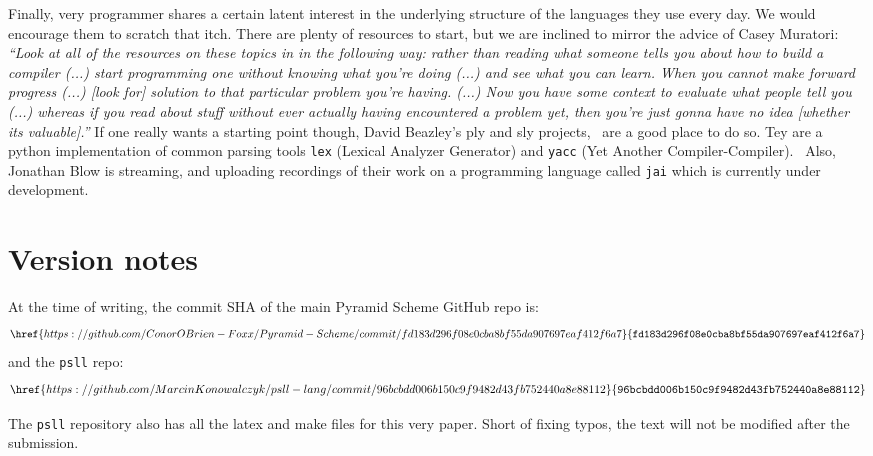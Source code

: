 \documentclass[aip,jcp,reprint,footinbib]{revtex4-1}
\let\tt\texttt
\newcommand\psll{\texttt{psll}\xspace}
\begin{document}
Finally, very programmer shares a certain latent interest in the underlying structure of the languages they use every day. We would encourage them to scratch that itch. There are plenty of resources to start, but we are inclined to mirror the advice of Casey Muratori:~\cite{blow2020qna} \textit{\enquote{Look at all of the resources on these topics in in the following way: rather than reading what someone tells you about how to build a compiler (...) start programming one without knowing what you're doing (...) and see what you can learn. When you cannot make forward progress (...) [look for] solution to that particular problem you're having. (...) Now you have some context to evaluate what people tell you (...) whereas if you read about stuff without ever actually having encountered a problem yet, then you're just gonna have no idea [whether its valuable].}} If one really wants a starting point though, David Beazley's ply and sly projects,~\cite{dbeaz2018,sly,ply} are a good place to do so. Tey are a python implementation of common parsing tools \tt{lex} (Lexical Analyzer Generator) and \tt{yacc} (Yet Another Compiler-Compiler).~\cite{levine1992} Also, Jonathan Blow is streaming, and uploading recordings of their work on a programming language called \tt{jai} which is currently under development.~\cite{blow2020}

\section*{Version notes}

\setlength{\abovedisplayskip}{3pt}
\setlength{\belowdisplayskip}{3pt}

At the time of writing, the commit SHA of the main Pyramid Scheme GitHub repo is:~\cite{pyra_git} 
\[
    \href{https://github.com/ConorOBrien-Foxx/Pyramid-Scheme/commit/fd183d296f08e0cba8bf55da907697eaf412f6a7}{\tt{fd183d296f08e0cba8bf55da907697eaf412f6a7}}
\]
and the \psll repo:~\cite{psll_git}
\[
    \href{https://github.com/MarcinKonowalczyk/psll-lang/commit/96bcbdd006b150c9f9482d43fb752440a8e88112}{\tt{96bcbdd006b150c9f9482d43fb752440a8e88112}}
\]

The \psll repository also has all the latex and make files for this very paper. Short of fixing typos, the text will not be modified after the submission.
\end{document}
